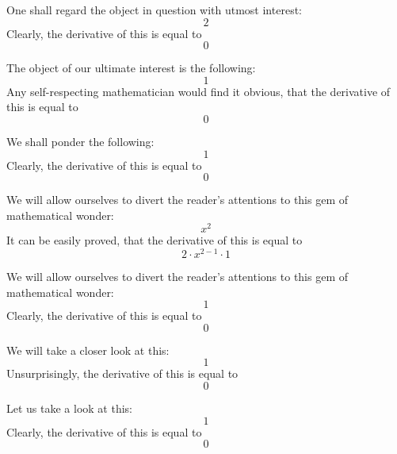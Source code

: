 \documentclass{article}
\begin{document}
One shall regard the object in question with utmost interest:
\begin{equation}
2 
\end{equation}
Clearly, the derivative of this is equal to
\begin{equation}
0 
\end{equation}

The object of our ultimate interest is the following:
\begin{equation}
1 
\end{equation}
Any self-respecting mathematician would find it obvious, that the derivative of this is equal to
\begin{equation}
0 
\end{equation}

We shall ponder the following:
\begin{equation}
1 
\end{equation}
Clearly, the derivative of this is equal to
\begin{equation}
0 
\end{equation}

We will allow ourselves to divert the reader's attentions to this gem of mathematical wonder:
\begin{equation}
x ^{2 } 
\end{equation}
It can be easily proved, that the derivative of this is equal to
\begin{equation}
2 \cdot x ^{2 - 1 } \cdot 1 
\end{equation}

We will allow ourselves to divert the reader's attentions to this gem of mathematical wonder:
\begin{equation}
1 
\end{equation}
Clearly, the derivative of this is equal to
\begin{equation}
0 
\end{equation}

We will take a closer look at this:
\begin{equation}
1 
\end{equation}
Unsurprisingly, the derivative of this is equal to
\begin{equation}
0 
\end{equation}

Let us take a look at this:
\begin{equation}
1 
\end{equation}
Clearly, the derivative of this is equal to
\begin{equation}
0 
\end{equation}
\end{document}
